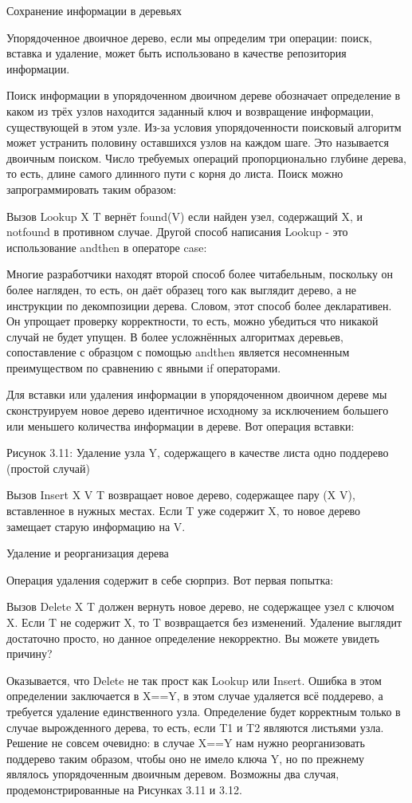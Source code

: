 Сохранение информации в деревьях

Упорядоченное двоичное дерево, если мы определим три операции: поиск, вставка и удаление, может быть использовано в качестве репозитория информации.

Поиск информации в упорядоченном двоичном дереве обозначает определение в каком из трёх узлов находится заданный ключ и возвращение информации, существующей в этом узле. Из-за условия упорядоченности поисковый алгоритм может устранить половину оставшихся узлов на каждом шаге. Это называется двоичным поиском. Число требуемых операций пропорционально глубине дерева, то есть, длине самого длинного пути с корня до листа. Поиск можно запрограммировать таким образом:

Вызов {Lookup X T} вернёт found(V) если найден узел, содержащий X, и notfound в противном случае. Другой способ написания Lookup - это использование andthen в операторе case:

Многие разработчики находят второй способ более читабельным, поскольку он более нагляден, то есть, он даёт образец того как выглядит дерево, а не инструкции по декомпозиции дерева. Словом, этот способ более декларативен. Он упрощает проверку корректности, то есть, можно убедиться что никакой случай не будет упущен. В более усложнённых алгоритмах деревьев, сопоставление с образцом с помощью andthen является несомненным преимуществом по сравнению с явными if операторами.

Для вставки или удаления информации в упорядоченном двоичном дереве мы сконструируем новое дерево идентичное исходному за исключением большего или меньшего количества информации в дереве. Вот операция вставки:

Рисунок 3.11: Удаление узла Y, содержащего в качестве листа одно поддерево (простой случай)

Вызов {Insert X V T} возвращает новое дерево, содержащее пару (X V), вставленное в нужных местах. Если T уже содержит X, то новое дерево замещает старую информацию на V.

Удаление и реорганизация дерева

Операция удаления содержит в себе сюрприз. Вот первая попытка:

Вызов {Delete X T} должен вернуть новое дерево, не содержащее узел с ключом X. Если T не содержит X, то T возвращается без изменений. Удаление выглядит достаточно просто, но данное определение некорректно. Вы можете увидеть причину?

Оказывается, что Delete не так прост как Lookup или Insert. Ошибка в этом определении заключается в X==Y, в этом случае удаляется всё поддерево, а требуется удаление единственного узла. Определение будет корректным только в случае вырожденного дерева, то есть, если T1 и T2 являются листьями узла. Решение не совсем очевидно: в случае X==Y нам нужно реорганизовать поддерево таким образом, чтобы оно не имело ключа Y, но по прежнему являлось упорядоченным двоичным деревом. Возможны два случая, продемонстрированные на Рисунках 3.11 и 3.12.

